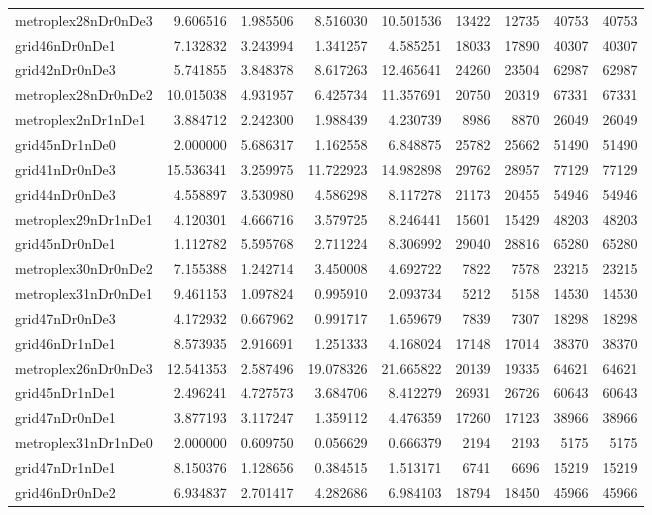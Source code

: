 \begin{longtable}{|l|r|r|r|r|r|r|r|r|}
metroplex28nDr0nDe3 & 9.606516 & 1.985506 & 8.516030 & 10.501536 & 13422 & 12735 & 40753 & 40753 \\
grid46nDr0nDe1 & 7.132832 & 3.243994 & 1.341257 & 4.585251 & 18033 & 17890 & 40307 & 40307 \\
grid42nDr0nDe3 & 5.741855 & 3.848378 & 8.617263 & 12.465641 & 24260 & 23504 & 62987 & 62987 \\
metroplex28nDr0nDe2 & 10.015038 & 4.931957 & 6.425734 & 11.357691 & 20750 & 20319 & 67331 & 67331 \\
metroplex2nDr1nDe1 & 3.884712 & 2.242300 & 1.988439 & 4.230739 & 8986 & 8870 & 26049 & 26049 \\
grid45nDr1nDe0 & 2.000000 & 5.686317 & 1.162558 & 6.848875 & 25782 & 25662 & 51490 & 51490 \\
grid41nDr0nDe3 & 15.536341 & 3.259975 & 11.722923 & 14.982898 & 29762 & 28957 & 77129 & 77129 \\
grid44nDr0nDe3 & 4.558897 & 3.530980 & 4.586298 & 8.117278 & 21173 & 20455 & 54946 & 54946 \\
metroplex29nDr1nDe1 & 4.120301 & 4.666716 & 3.579725 & 8.246441 & 15601 & 15429 & 48203 & 48203 \\
grid45nDr0nDe1 & 1.112782 & 5.595768 & 2.711224 & 8.306992 & 29040 & 28816 & 65280 & 65280 \\
metroplex30nDr0nDe2 & 7.155388 & 1.242714 & 3.450008 & 4.692722 & 7822 & 7578 & 23215 & 23215 \\
metroplex31nDr0nDe1 & 9.461153 & 1.097824 & 0.995910 & 2.093734 & 5212 & 5158 & 14530 & 14530 \\
grid47nDr0nDe3 & 4.172932 & 0.667962 & 0.991717 & 1.659679 & 7839 & 7307 & 18298 & 18298 \\
grid46nDr1nDe1 & 8.573935 & 2.916691 & 1.251333 & 4.168024 & 17148 & 17014 & 38370 & 38370 \\
metroplex26nDr0nDe3 & 12.541353 & 2.587496 & 19.078326 & 21.665822 & 20139 & 19335 & 64621 & 64621 \\
grid45nDr1nDe1 & 2.496241 & 4.727573 & 3.684706 & 8.412279 & 26931 & 26726 & 60643 & 60643 \\
grid47nDr0nDe1 & 3.877193 & 3.117247 & 1.359112 & 4.476359 & 17260 & 17123 & 38966 & 38966 \\
metroplex31nDr1nDe0 & 2.000000 & 0.609750 & 0.056629 & 0.666379 & 2194 & 2193 & 5175 & 5175 \\
grid47nDr1nDe1 & 8.150376 & 1.128656 & 0.384515 & 1.513171 & 6741 & 6696 & 15219 & 15219 \\
grid46nDr0nDe2 & 6.934837 & 2.701417 & 4.282686 & 6.984103 & 18794 & 18450 & 45966 & 45966 \\

\end{longtable}
